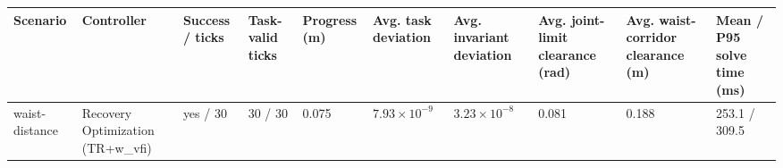 \begin{tabular}{llllllllll}
\toprule
Scenario & Controller & Success / ticks & Task-valid ticks & Progress (m) & Avg. task deviation & Avg. invariant deviation & Avg. joint-limit clearance (rad) & Avg. waist-corridor clearance (m) & Mean / P95 solve time (ms) \\
\midrule
waist-distance & Recovery Optimization (TR+w\_vfi) & yes / 30 & 30 / 30 & 0.075 & $7.93\times 10^{-9}$ & $3.23\times 10^{-8}$ & 0.081 & 0.188 & 253.1 / 309.5 \\
\bottomrule
\end{tabular}
